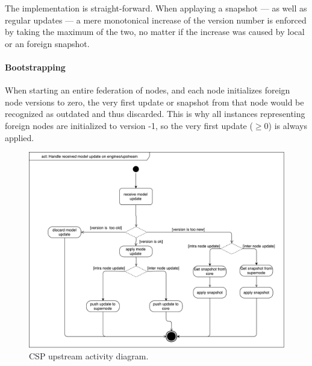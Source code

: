 The implementation is straight-forward. When applaying a snapshot --- as well as regular
updates --- a mere monotonical increase of the version number is enforced by
taking the maximum of the two, no matter if the increase was caused by local or
an foreign snapshot.

\paragraph{Bootstrapping}
When starting an entire federation of nodes, and each node initializes foreign
node versions to zero, the very first update or snapshot from that node would
be recognized as outdated and thus discarded. This is why all
 instances representing foreign nodes are
initialized to version -1, so the very first update ($\geqslant 0$) is always
applied.

\begin{figure}[]
	\includegraphics[width=\textwidth]{img/activity_diagram_upstream.pdf}
	\caption{CSP upstream activity diagram.}
	\label{fig:csp:upstream-activty}
\end{figure}

